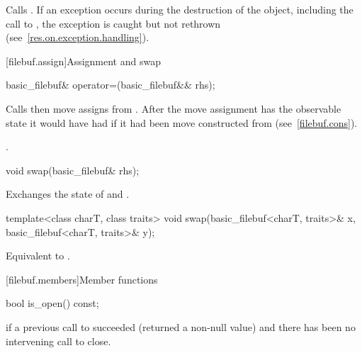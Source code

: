 \begin{itemdescr}
\pnum
\effects
Calls
.
If an exception occurs during the destruction of the object, including the call to , the exception is caught but not rethrown (see~\ref{res.on.exception.handling}).
\end{itemdescr}

[filebuf.assign]{Assignment and swap}

%
\begin{itemdecl}
basic_filebuf& operator=(basic_filebuf&& rhs);
\end{itemdecl}

\begin{itemdescr}
\pnum
\effects
Calls  then move assigns from . After the
move assignment  has the observable state it would have had if it
had been move constructed from  (see~\ref{filebuf.cons}).

\pnum
\returns
{}.
\end{itemdescr}

%
\begin{itemdecl}
void swap(basic_filebuf& rhs);
\end{itemdecl}

\begin{itemdescr}
\pnum
\effects
Exchanges the state of 
and .
\end{itemdescr}

%
\begin{itemdecl}
template<class charT, class traits>
  void swap(basic_filebuf<charT, traits>& x, basic_filebuf<charT, traits>& y);
\end{itemdecl}

\begin{itemdescr}
\pnum
\effects
Equivalent to .
\end{itemdescr}

[filebuf.members]{Member functions}

%
\begin{itemdecl}
bool is_open() const;
\end{itemdecl}

\begin{itemdescr}
\pnum
\returns
{}
if a previous call to
succeeded (returned a non-null value) and there has been no intervening
call to close.
\end{itemdescr}

